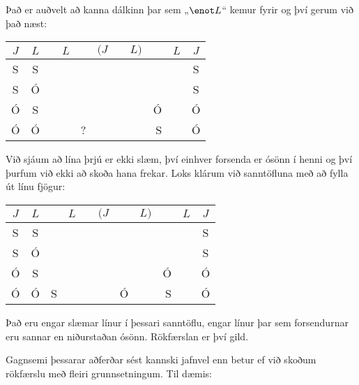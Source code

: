 Það er auðvelt að kanna dálkinn þar sem „$\enot L$“ kemur fyrir og því gerum við það næst:
\begin{center}
	\begin{tabular}{c c|d e e e e f |d f|c}
		$J$&$L$&\enot&$L$&\eif&$(J$&\eor&$L)$&\enot&$L$&$J$\\
		\hline
		S & S & &&&&&&&& {S}\\
		S & Ó & &&&&&&&& {S}\\
		Ó & S & &&&&&&{Ó}&& {Ó}\\
		Ó & Ó & &&?&&&&{S}&& {Ó}
	\end{tabular}
\end{center}
Við sjáum að lína þrjú er ekki slæm, því einhver forsenda er ósönn í henni og því þurfum við ekki að skoða hana frekar. Loks klárum við sanntöfluna með að fylla út línu fjögur:
\begin{center}
	\begin{tabular}{c c|d e e e e f |d f|c}
		$J$&$L$&\enot&$L$&\eif&$(J$&\eor&$L)$&\enot&$L$&$J$\\
		\hline
		S & S & &&&&&&&& {S}\\
		S & Ó & &&&&&&&& {S}\\
		Ó & S & &&&&&&{Ó}& & {Ó}\\
		Ó & Ó & S &  &  &  & Ó & & {S} & & {Ó}
	\end{tabular}
\end{center}
Það eru engar slæmar línur í þessari sanntöflu, engar línur þar sem forsendurnar eru sannar en niðurstaðan ósönn. Rökfærslan er því gild.

Gagnsemi þessarar aðferðar sést kannski jafnvel enn betur ef við skoðum rökfærslu með fleiri grunnsetningum. Til dæmis:

